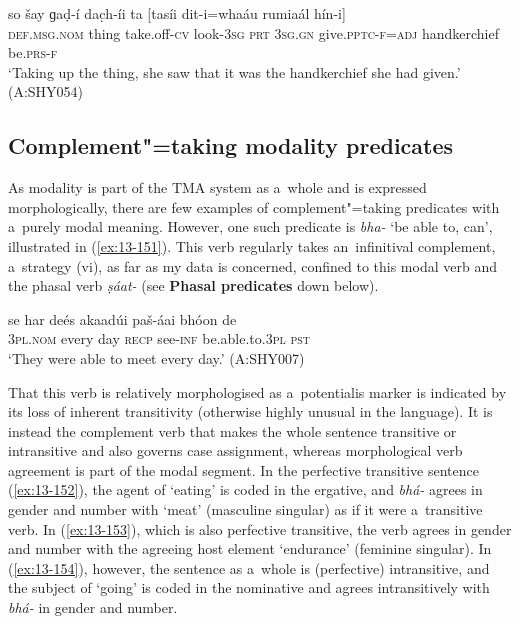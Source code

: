 \begin{exe}
\ex
\label{ex:13-150}
\gll so šay ɡaḍ-í dac̣h-íi ta [tasíi  dit-i=whaáu rumiaál hín-i] \\
\textsc{def.msg.nom} thing take.off-\textsc{cv} look-\textsc{3sg} \textsc{prt} \textsc{3sg.gn} give.\textsc{pptc-f}=\textsc{adj} handkerchief be.\textsc{prs-f} \\
\glt `Taking up the thing, she saw that it was the handkerchief she had given.' (A:SHY054)
\end{exe}

\subsection{Complement"=taking modality predicates}
\label{subsec:13-5-2}

 As modality is part of the TMA system as a~whole and is expressed morphologically, there are few examples of complement"=taking predicates with a~purely modal meaning. However, one such predicate is \textit{bha-} `be able to, can', illustrated in (\ref{ex:13-151}). This verb regularly takes an~infinitival complement, a~strategy (vi), as far as my data is concerned, confined to this modal verb and the phasal verb \textit{ṣáat-} (see \textbf{Phasal predicates} down below).

\begin{exe}
\ex
\label{ex:13-151}
\gll se har deés akaadúi paš-áai bhóon de  \\
\textsc{3pl.nom} every day \textsc{recp} see-\textsc{inf} be.able.to.\textsc{3pl} \textsc{pst} \\
\glt `They were able to meet every day.' (A:SHY007) 
\end{exe}

That this verb is relatively morphologised as a~potentialis marker is indicated by its loss of inherent transitivity (otherwise highly unusual in the language). It is instead the complement verb that makes the whole sentence transitive or intransitive and also governs case assignment, whereas morphological verb agreement is part of the modal segment. In the perfective transitive sentence (\ref{ex:13-152}), the agent of `eating' is coded in the ergative, and \textit{bhá-} agrees in gender and number with `meat' (masculine singular) as if it were a~transitive verb. In (\ref{ex:13-153}), which is also perfective transitive, the verb agrees in gender and number with the agreeing host element `endurance' (feminine singular). In (\ref{ex:13-154}), however, the sentence as a~whole is (perfective) intransitive, and the subject of `going' is coded in the nominative and agrees intransitively with \textit{bhá-} in gender and number.


